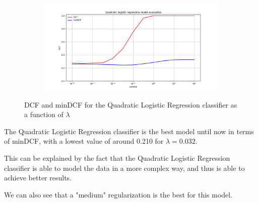 \documentclass[12pt]{report}
\newcommand{\nl}{%
    \newline
    \noindent
}
\begin{document}
\begin{figure}[H]
    \centering
    \begin{subfigure}[t]{0.6\textwidth}
        \includegraphics[width=\textwidth]{./plot/LR/quadratic_log_reg.png}
    \end{subfigure}
    \caption{DCF and minDCF for the Quadratic Logistic Regression classifier as a function of $\lambda$}
    \label{fig:qlr}
\end{figure}
\noindent
The Quadratic Logistic Regression classifier is the best model until now in terms of minDCF, with a lowest value of around 0.210 for $\lambda = 0.032$.
\nl
This can be explained by the fact that the Quadratic Logistic Regression classifier is able to model the data in a more complex way, and thus is able to achieve better results.
\nl
We can also see that a "medium" regularization is the best for this model.
\end{document}
